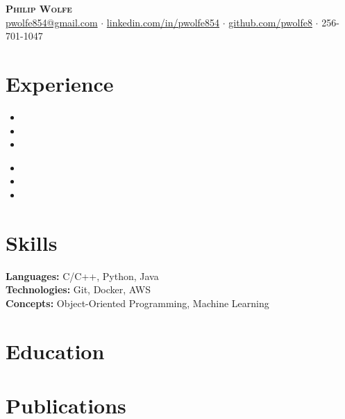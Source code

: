 \documentclass[11pt, a4paper]{article}
\newcommand{\header}[7]{
  \begin{center}
    {\LARGE \bfseries\scshape #1}\\
    \vspace{2mm}
    \href{mailto:#2}{#2} $\cdot$ \href{#3}{#6} $\cdot$ \href{#4}{#7} $\cdot$ #5\\
    \vspace{0mm}
  \end{center}
}
\begin{document}
\header{Philip Wolfe}{pwolfe854@gmail.com}{https://www.linkedin.com/in/pwolfe854}{https://github.com/pwolfe8}{256-701-1047}{linkedin.com/in/pwolfe854}{github.com/pwolfe8}

\section*{Experience}

\workplaceGTRI
\begin{itemize}
  \item \fpgaShort
  \item \fpgaMedium
  \item \fpgaLong
\end{itemize}

\workplaceBeam
\begin{itemize}
  \item \fpgaShort
  \item \fpgaMedium
  \item \fpgaLong
\end{itemize}

\section*{Skills}
{\scriptsize
    \textbf{Languages:} C/C++, Python, Java\\
    \textbf{Technologies:} Git, Docker, AWS\\
    \textbf{Concepts:} Object-Oriented Programming, Machine Learning\par
}

\section*{Education}
{\scriptsize
  \educationSimple
}

\section*{Publications}
{\scriptsize
  \publications
}

\end{document}

